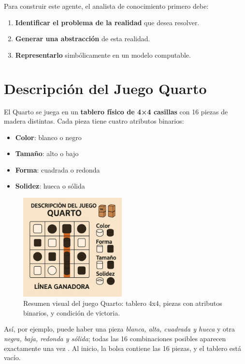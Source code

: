 \documentclass[conference]{IEEEtran}
\begin{document}
Para construir este agente, el analista de conocimiento primero debe:
\begin{enumerate}
\item \textbf{Identificar el problema de la realidad} que desea resolver.
\item \textbf{Generar una abstracción} de esta realidad.
\item \textbf{Representarlo} simbólicamente en un modelo computable.
\end{enumerate}

\section{Descripción del Juego Quarto}

El Quarto se juega en un \textbf{tablero físico de 4×4 casillas} con 16 piezas de madera distintas. Cada pieza tiene cuatro atributos binarios:
\begin{itemize}
\item \textbf{Color}: blanco o negro
\item \textbf{Tamaño}: alto o bajo
\item \textbf{Forma}: cuadrada o redonda
\item \textbf{Solidez}: hueca o sólida
\end{itemize}


\begin{figure}[h!]
	\centering
	\includegraphics[width=0.48\textwidth]{quarto_tablero.png}
	\caption{Resumen visual del juego Quarto: tablero 4x4, piezas con atributos binarios, y condición de victoria.}
	\label{fig:quarto}
\end{figure}


Así, por ejemplo, puede haber una pieza \textit{blanca, alta, cuadrada y hueca} y otra \textit{negra, baja, redonda y sólida}; todas las 16 combinaciones posibles aparecen exactamente una vez \cite{muller2009}. Al inicio, la bolsa contiene las 16 piezas, y el tablero está vacío.
\end{document}
